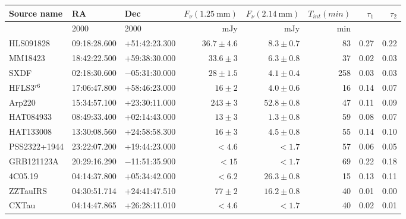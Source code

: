 \begin{table}
\begin{center}
\begin{tabular}{lllrrrrr}
\hline
\hline
Source name & RA & Dec & $F_{\nu}\mathrm{(1.25~mm)}$ & $F_{\nu}\mathrm{(2.14~mm)}$       & $T_{int} (min)$ &  $\tau_{1}$ & $\tau_{2}$ \\
\hline
            & 2000 & 2000 &mJy          &mJy              & min      &              & \\
\hline
HLS091828     &  09:18:28.600  &  +51:42:23.300 & $36.7   \pm  4.6$  & $8.3 \pm 0.7 $   & 83 & 0.27 & 0.22 \\
MM18423       &  18:42:22.500  &  +59:38:30.000 & $33.6   \pm  3$  & $6.3 \pm 0.8 $   & 37 & 0.02 & 0.03 \\
SXDF          &  02:18:30.600  &  $-$05:31:30.000 & $28   \pm  1.5$  & $4.1 \pm 0.4 $   & 258& 0.03 & 0.03 \\
HFLS3$^{r6}$   &  17:06:47.800  &  +58:46:23.000 & $16   \pm  2$  & $4.0 \pm 0.6 $  & 16 & 0.14 & 0.07 \\ \hline
Arp220        &  15:34:57.100  &  +23:30:11.000 & $243  \pm  3 $  & $52.8  \pm 0.8 $   & 47 & 0.11 & 0.09 \\
HAT084933     &  08:49:33.400  &  +02:14:43.000 & $13   \pm  3$  & $1.3 \pm 0.8 $   & 59 & 0.08 & 0.07 \\
HAT133008     &  13:30:08.560  &  +24:58:58.300 & $16   \pm  3$  & $4.5 \pm 0.8 $   & 55 & 0.14 & 0.10 \\
PSS2322+1944  &  23:22:07.200  &  +19:44:23.000 & $<4.6         $  & $<1.7          $   & 57 & 0.06 & 0.05 \\
GRB121123A    &  20:29:16.290  &  $-$11:51:35.900 & $<15        $  & $<1.7          $   & 69 & 0.22 & 0.18 \\
4C05.19       &  04:14:37.800  &  +05:34:42.000 & $<6.2        $   & $26.3 \pm 0.8          $   & 15 & 0.13 & 0.11 \\
ZZTauIRS      &  04:30:51.714  &  +24:41:47.510 & $77  \pm  2$   & $16.2  \pm 0.8 $   & 40 & 0.01 & 0.00 \\
CXTau         &  04:14:47.865  &  +26:28:11.010 & $<4.6      $   & $<1.7          $   & 40 & 0.02 & 0.01 \\
\hline \hline


\end{tabular}
\end{center}
\end{table}

